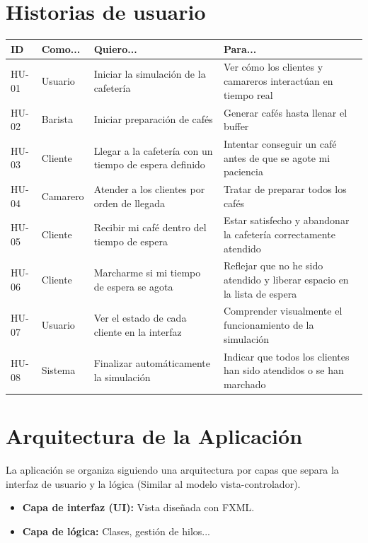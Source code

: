 \documentclass[a4paper,12pt]{article}
\begin{document}
    \section{Historias de usuario}
    \begin{center}  
    \begin{tabularx}{0.8\textwidth}{|X|X|X|X|}
        \hline
        \textbf{ID} & \textbf{Como...} & \textbf{Quiero...} & \textbf{Para...} \\
        \hline
        HU-01 & Usuario & Iniciar la simulación de la cafetería & Ver cómo los clientes y camareros interactúan en tiempo real \\            
        \hline
        HU-02 & Barista & Iniciar preparación de cafés & Generar cafés hasta llenar el buffer \\            
        \hline
        HU-03 & Cliente & Llegar a la cafetería con un tiempo de espera definido & Intentar conseguir un café antes de que se agote mi paciencia \\            
        \hline
        HU-04 & Camarero & Atender a los clientes por orden de llegada & Tratar de preparar todos los cafés \\            
        \hline
        HU-05 & Cliente & Recibir mi café dentro del tiempo de espera & Estar satisfecho y abandonar la cafetería correctamente atendido \\            
        \hline
        HU-06 & Cliente & Marcharme si mi tiempo de espera se agota & Reflejar que no he sido atendido y liberar espacio en la lista de espera \\            
        \hline
        HU-07 & Usuario & Ver el estado de cada cliente en la interfaz & Comprender visualmente el funcionamiento de la simulación \\            
        \hline
        HU-08 & Sistema & Finalizar automáticamente la simulación & Indicar que todos los clientes han sido atendidos o se han marchado \\            
        \hline  
    \end{tabularx}
    \end{center}
    \section{Arquitectura de la Aplicación}
    La aplicación se organiza siguiendo una arquitectura por capas que separa la interfaz de usuario y la lógica (Similar al modelo vista-controlador).
    \begin{itemize}
        \item \textbf{Capa de interfaz (UI):} Vista diseñada con FXML.
        \item \textbf{Capa de lógica:} Clases, gestión de hilos...
    \end{itemize}
\end{document}
